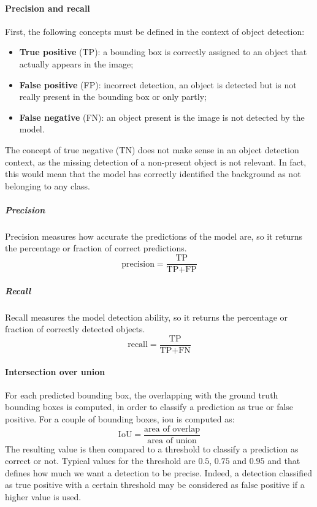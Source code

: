 \documentclass[%
    corpo=12pt,
    twoside,
    stile=classica,   
    tipotesi=magistrale,
    evenboxes,
    english,
	numerazioneromana,
]{toptesi}
\begin{document}
\paragraph{Precision and recall}
First, the following concepts must be defined in the context of object detection:
\begin{itemize}
	\item \textbf{True positive} (TP): a bounding box is correctly assigned to an object that actually appears in the image;
	\item \textbf{False positive} (FP): incorrect detection, an object is detected but is not really present in the bounding box or only partly;
	\item \textbf{False negative} (FN): an object present is the image is not detected by the model.
\end{itemize}
The concept of true negative (TN) does not make sense in an object detection context, as the missing detection of a non-present object is not relevant. In fact, this would mean that the model has correctly identified the background as not belonging to any class.

\subparagraph{Precision}
Precision measures how accurate the predictions of the model are, so it returns the percentage or fraction of correct predictions.
\begin{equation}
	\text{precision} = \frac{\text{TP}}{\text{TP}+\text{FP}}
\end{equation}

\subparagraph{Recall}
Recall measures the model detection ability, so it returns the percentage or fraction of correctly detected objects.
\begin{equation}
	\text{recall} = \frac{\text{TP}}{\text{TP}+\text{FN}}
\end{equation}

\paragraph{Intersection over union}
For each predicted bounding box, the overlapping with the ground truth bounding boxes is computed, in order to classify a prediction as true or false positive. For a couple of bounding boxes, \gls{iou} is computed as:
\begin{equation}
	\text{IoU} = \frac{\text{area of overlap}}{\text{area of union}}
\end{equation}
The resulting value is then compared to a threshold to classify a prediction as correct or not. Typical values for the threshold are $0.5$, $0.75$ and $0.95$ and that defines how much we want a detection to be precise. Indeed, a detection classified as true positive with a certain threshold may be considered as false positive if a higher value is used.
\end{document}
